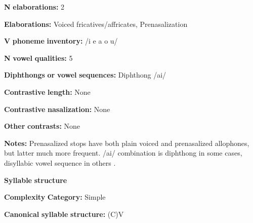 \begin{styleBody}
\textbf{N} \textbf{elaborations:} 2
\end{styleBody}

\begin{styleBody}
\textbf{Elaborations:} Voiced fricatives/affricates, Prenasalization
\end{styleBody}

\begin{styleBody}
\textbf{V} \textbf{phoneme} \textbf{inventory:} /i e a o u/
\end{styleBody}

\begin{styleBody}
\textbf{N} \textbf{vowel} \textbf{qualities:} 5
\end{styleBody}

\begin{styleBody}
\textbf{Diphthongs} \textbf{or} \textbf{vowel} \textbf{sequences:} Diphthong /ai/
\end{styleBody}

\begin{styleBody}
\textbf{Contrastive} \textbf{length:} None
\end{styleBody}

\begin{styleBody}
\textbf{Contrastive} \textbf{nasalization:} None
\end{styleBody}

\begin{styleBody}
\textbf{Other} \textbf{contrasts:} None
\end{styleBody}

\begin{styleBody}
\textbf{Notes:} Prenasalized stops have both plain voiced and prenasalized allophones, but latter much more frequent. /ai/ combination is diphthong in some cases, disyllabic vowel sequence in others \citep[22]{Wegener2008}.
\end{styleBody}

\begin{styleBody}
\textbf{Syllable} \textbf{structure}
\end{styleBody}

\begin{styleBody}
\textbf{Complexity} \textbf{Category:} Simple
\end{styleBody}

\begin{styleBody}
\textbf{Canonical} \textbf{syllable} \textbf{structure:} (C)V \citep[23-4]{Wegener2008}
\end{styleBody}

